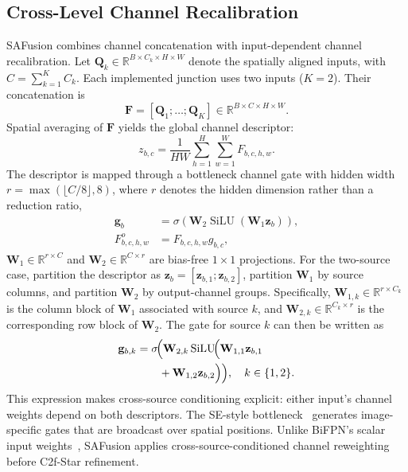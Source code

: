 \documentclass[letterpaper,10pt,conference]{ieeeconf}
\begin{document}
\subsection{Cross-Level Channel Recalibration}
SAFusion combines channel concatenation with input-dependent
channel recalibration. Let \(\mathbf Q_k\in\mathbb R^{B\times C_k\times H\times W}\) denote the spatially aligned inputs, with \(C=\sum_{k=1}^{K}C_k\). Each implemented junction uses two inputs (\(K=2\)). Their concatenation is
\begin{equation}
 \mathbf{F}=[\mathbf{Q}_{1};\ldots;\mathbf{Q}_{K}]
 \in\mathbb{R}^{B\times C\times H\times W}.
 \label{eq:saf_concat}
\end{equation}
Spatial averaging of \(\mathbf F\) yields the global channel descriptor:
\begin{equation}
 z_{b,c}=\frac{1}{HW}\sum_{h=1}^{H}\sum_{w=1}^{W}F_{b,c,h,w}.
 \label{eq:gap}
\end{equation}
The descriptor is mapped through a bottleneck channel gate with hidden width
\(r=\max(\lfloor C/8\rfloor,8)\), where \(r\) denotes the hidden dimension rather
than a reduction ratio,
\begin{align}
 \mathbf{g}_{b}&=\sigma\!\left(\mathbf{W}_{2}
   \operatorname{SiLU}(\mathbf{W}_{1}\mathbf{z}_{b})\right),\nonumber\\
 F^{o}_{b,c,h,w}&=F_{b,c,h,w}g_{b,c},
 \label{eq:saf_output}
\end{align}
\(\mathbf{W}_{1}\in\mathbb{R}^{r\times C}\) and
\(\mathbf{W}_{2}\in\mathbb{R}^{C\times r}\) are bias-free \(1\times1\)
projections. For the two-source case, partition the descriptor as
\(\mathbf{z}_{b}=[\mathbf{z}_{b,1};\mathbf{z}_{b,2}]\), partition
\(\mathbf{W}_{1}\) by source columns, and partition \(\mathbf{W}_{2}\) by
output-channel groups. Specifically,
\(\mathbf{W}_{1,k}\in\mathbb{R}^{r\times C_k}\) is the column block of
\(\mathbf{W}_{1}\) associated with source \(k\), and
\(\mathbf{W}_{2,k}\in\mathbb{R}^{C_k\times r}\) is the corresponding row
block of \(\mathbf{W}_{2}\). The gate for source \(k\) can then be written as
\begin{equation}
 \begin{aligned}
 \mathbf{g}_{b,k}
 &=\sigma\!\Bigl(\mathbf{W}_{2,k}\operatorname{SiLU}\!\Bigl(
   \mathbf{W}_{1,1}\mathbf{z}_{b,1} \\
 &\qquad{}+\mathbf{W}_{1,2}\mathbf{z}_{b,2}\Bigr)\Bigr),
 \quad k\in\{1,2\}.
 \end{aligned}
 \label{eq:saf_cross_source}
\end{equation}
This expression makes cross-source conditioning explicit: either input's
channel weights depend on both descriptors. The SE-style
bottleneck~\cite{ref_senet} generates image-specific gates that are broadcast
over spatial positions. Unlike BiFPN's scalar input weights~\cite{ref_efficientdet},
SAFusion applies cross-source-conditioned channel reweighting before C2f-Star
refinement.
\end{document}
